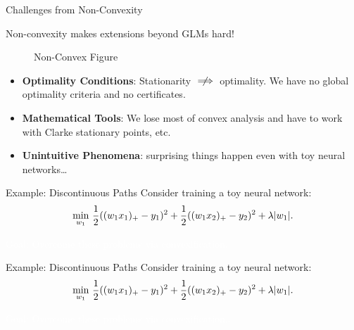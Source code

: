 \documentclass[usenames,dvipsnames,mathserif,notheorems]{beamer}
\newcommand{\bad}[1]{\textcolor{bad}{#1}}
\def\showtikz{}
\begin{document}
\begin{frame}{Challenges from Non-Convexity}
	\begin{center}
		\Large
		Non-convexity makes extensions beyond GLMs \bad{hard}!
	\end{center}

	\begin{figure}[]
		\centering
		\ifdefined\showtikz
			
		\else
			\Huge Non-Convex Figure
		\fi
	\end{figure}

	\pause
	\begin{itemize}
		\item \textbf{Optimality Conditions}: Stationarity \( \centernot \implies \) optimality.
		      We have no global optimality criteria and no certificates.

		      \vspace{1em}

		      \pause
		\item \textbf{Mathematical Tools}: We lose most of convex analysis
		      and have to work with Clarke stationary points, etc.
		      \vspace{1em}

		      \pause

		\item \textbf{Unintuitive Phenomena}: surprising things happen even
		      with toy neural networks\ldots

	\end{itemize}

\end{frame}

\begin{frame}{Example: Discontinuous Paths}
	Consider training a toy neural network:
	\[
		\min_{w_1} \, \frac 1 2 ((w_1 x_1)_+ - y_1)^2 + \frac 1 2 ((w_1 x_2)_+ - y_2)^2 + \lambda |w_1|.
	\]
	\pause

	\begin{center}
		
	\end{center}

	\begin{center}
		\Large
		\textcolor{white}{Goal: Overcome these problems via convexification..}
	\end{center}

\end{frame}

\begin{frame}{Example: Discontinuous Paths}
	Consider training a toy neural network:
	\[
		\min_{w_1} \, \frac 1 2 ((w_1 x_1)_+ - y_1)^2 + \frac 1 2 ((w_1 x_2)_+ - y_2)^2 + \lambda |w_1|.
	\]

	\begin{center}
		
	\end{center}

	\begin{center}
		\Large
		\textcolor{white}{Goal: Overcome these problems via convexification..}
	\end{center}

\end{frame}
\end{document}
